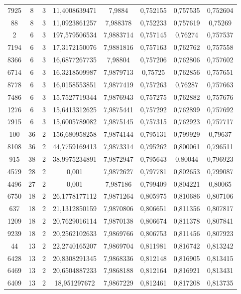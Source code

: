 \begin{longtable}{|c|c|c|c|c|c|c|c|}
7925 & 8 & 3 & 11,4008639471 & 7,9884 & 0,752155 & 0,757535 & 0,752604 \\
88 & 8 & 3 & 11,0923861257 & 7,988378 & 0,752233 & 0,757619 & 0,75269 \\
2 & 6 & 3 & 197,579506534 & 7,9883714 & 0,757145 & 0,76274 & 0,757537 \\
7194 & 6 & 3 & 17,3172150076 & 7,9881816 & 0,757163 & 0,762762 & 0,757558 \\
8366 & 6 & 3 & 16,6877267735 & 7,98804 & 0,757206 & 0,762806 & 0,757602 \\
6714 & 6 & 3 & 16,3218509987 & 7,9879713 & 0,75725 & 0,762856 & 0,757651 \\
8778 & 6 & 3 & 16,0158553851 & 7,9877419 & 0,757263 & 0,76287 & 0,757663 \\
7486 & 6 & 3 & 15,7527719344 & 7,9876943 & 0,757275 & 0,762882 & 0,757676 \\
1276 & 6 & 3 & 15,6413312625 & 7,9875441 & 0,757292 & 0,762899 & 0,757692 \\
7915 & 6 & 3 & 15,6005789082 & 7,9875145 & 0,757315 & 0,762923 & 0,757717 \\
100 & 36 & 2 & 156,680958258 & 7,9874144 & 0,795131 & 0,799929 & 0,79637 \\
8108 & 36 & 2 & 44,7759169413 & 7,9873314 & 0,795262 & 0,800061 & 0,796511 \\
915 & 38 & 2 & 38,9975234891 & 7,9872947 & 0,795643 & 0,80044 & 0,796923 \\
4579 & 28 & 2 & 0,001 & 7,9872627 & 0,797781 & 0,802653 & 0,799087 \\
4496 & 27 & 2 & 0,001 & 7,987186 & 0,799409 & 0,804221 & 0,80065 \\
6750 & 18 & 2 & 26,1778177112 & 7,9871264 & 0,805975 & 0,810686 & 0,807106 \\
637 & 18 & 2 & 21,1312850159 & 7,9870806 & 0,806651 & 0,811356 & 0,807817 \\
1209 & 18 & 2 & 20,7629016114 & 7,9870138 & 0,806674 & 0,811378 & 0,807841 \\
9239 & 18 & 2 & 20,2562102633 & 7,9869766 & 0,806753 & 0,811456 & 0,807923 \\
44 & 13 & 2 & 22,2740165207 & 7,9869704 & 0,811981 & 0,816742 & 0,813242 \\
6428 & 13 & 2 & 20,8308291345 & 7,9868336 & 0,812148 & 0,816905 & 0,813415 \\
6469 & 13 & 2 & 20,6504887233 & 7,9868188 & 0,812164 & 0,816921 & 0,813431 \\
6409 & 13 & 2 & 18,951297672 & 7,9867229 & 0,812461 & 0,817208 & 0,813735 \\

\end{longtable}
